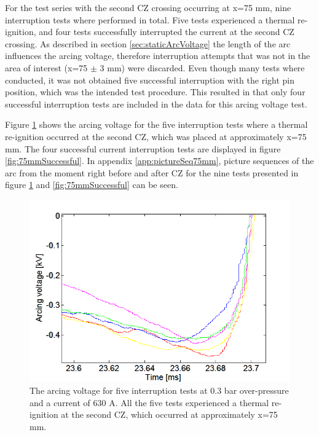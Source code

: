 \documentclass[10pt,b5paper,twoside]{article}
\begin{document}
For the test series with the second CZ crossing occurring at x=75 mm, nine interruption tests where performed in total. Five tests experienced a thermal re-ignition, and four tests successfully interrupted the current at the second CZ crossing. As described in section \ref{sec:staticArcVoltage} the length of the arc influences the arcing voltage, therefore interruption attempts that was not in the area of interest (x=75 $\pm$ 3 mm) were discarded. Even though many tests where conducted, it was not obtained five successful interruption with the right pin position, which was the intended test procedure. This resulted in that only four successful interruption tests are included in the data for this arcing voltage test.

Figure \ref{fig:75mmUnSuccessful} shows the arcing voltage for the five interruption tests where a thermal re-ignition occurred at the second CZ, which was placed at approximately x=75 mm. The four successful current interruption tests are displayed in figure \ref{fig:75mmSuccessful}. In appendix \ref{app:pictureSeq75mm}, picture sequences of the arc from the moment right before and after CZ for the nine tests presented in figure \ref{fig:75mmUnSuccessful} and \ref{fig:75mmSuccessful} can be seen.

\begin{figure}[H]
\centering
\includegraphics[scale=0.6, angle =0 ]{Bilder/Results/ArcingVoltage_75_reIgnition.PNG}
\caption{The arcing voltage for five interruption tests at 0.3 bar over-pressure and a current of 630 A. All the five tests experienced a thermal re-ignition at the second CZ, which occurred at approximately  x=75 mm.} \label{fig:75mmUnSuccessful}
\end{figure}
\end{document}
